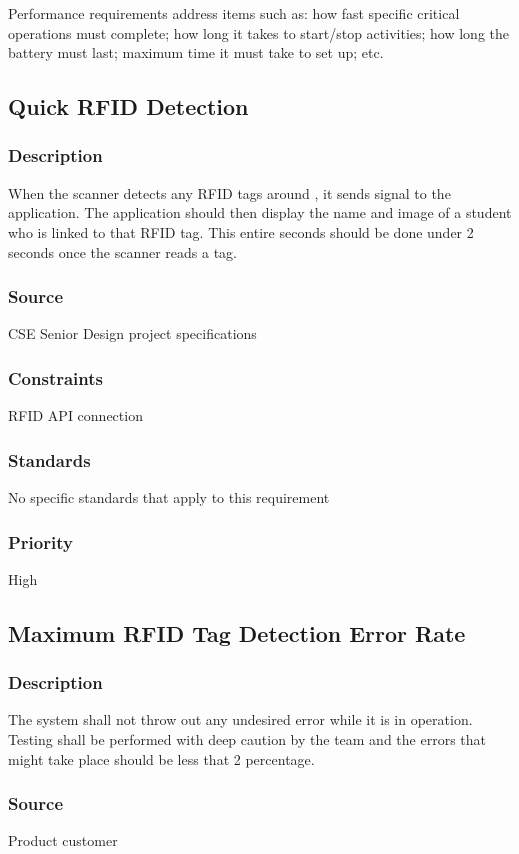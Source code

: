 \quad \quad Performance requirements 
address items such as: how fast specific critical operations must complete; how long 
it takes to start/stop activities; how long the battery must last; maximum time it 
must take to set up; etc.

\subsection{Quick RFID Detection}
\subsubsection{Description}
\quad \quad When the scanner detects any RFID tags around , it sends signal to the application. 
The application should then display the name and image of a student who is linked to 
that RFID tag. This entire seconds should be done under 2 seconds once the scanner 
reads a tag.
\subsubsection{Source}
\quad \quad CSE Senior Design project specifications
\subsubsection{Constraints}
\quad \quad RFID API connection
\subsubsection{Standards}
\quad \quad No specific standards that apply to this requirement
\subsubsection{Priority}
\quad \quad High

\subsection{Maximum RFID Tag Detection Error Rate}
\subsubsection{Description}
\quad \quad The system shall not throw out any undesired error while it is in operation. Testing 
shall be performed with deep caution by the team and the errors that might take place 
should be less that 2 percentage. 
\subsubsection{Source}
\quad \quad Product customer
